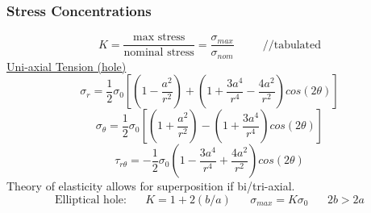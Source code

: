 \documentclass[twocolumn, 12pt]{article}    %
\begin{document}
\subsubsection*{Stress Concentrations}
\begin{equation*}
    K =\frac{\text{max stress}}{\text{nominal stress}} = \frac{\sigma_{max}}{\sigma_{nom}} \hspace{30pt} \text{//tabulated}
\end{equation*}
\underline{Uni-axial Tension (hole)}\\
\begin{equation*}
    \sigma_r = \frac{1}{2}\sigma_0 \left[ \left( 1 -\frac{a^2}{r^2} \right) + \left(1 + \frac{3a^4}{r^4} -\frac{4a^2}{r^2} \right) cos(2\theta)\right]
\end{equation*}
\begin{equation*}
    \sigma_\theta = \frac{1}{2}\sigma_0 \left[ \left( 1 +\frac{a^2}{r^2} \right) - \left(1 + \frac{3a^4}{r^4} \right) cos(2\theta)\right]
\end{equation*}
\begin{equation*}
    \tau_{r\theta} = -\frac{1}{2}\sigma_0 \left(1 - \frac{3a^4}{r^4} + \frac{4a^2}{r^2} \right) cos(2\theta)
\end{equation*}
Theory of elasticity allows for superposition if bi/tri-axial. 
\begin{equation*}
    \text{Elliptical hole:} \hspace{20pt} K = 1+ 2(b/a) \hspace{20pt}  \sigma_{max} = K \sigma_0 \hspace{20pt} 2b>2a
\end{equation*}
\end{document}
